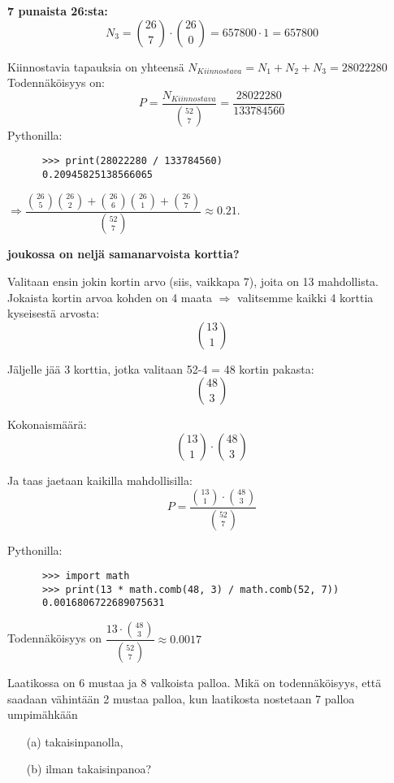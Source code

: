 \documentclass[12pt,a4paper]{article}
\begin{document}
\begin{kohta}
\begin{alakohta}
    \item \textbf{7 punaista 26:sta:} \\
    \[ N_3 = \binom{26}{7} \cdot \binom{26}{0} = 657800 \cdot 1 = 657800 \]
\end{alakohta}
Kiinnostavia tapauksia on yhteensä $N_{Kiinnostava} = N_1 + N_2 + N_3 = 28022280$\\

Todennäköisyys on:
\[
P = \frac{N_{Kiinnostava}}{\binom{52}{7}} = \frac{28022280}{133784560}
\]
  Pythonilla:
    \begin{verbatim}
      >>> print(28022280 / 133784560)
      0.20945825138566065
    \end{verbatim}

$\Rightarrow  \dfrac{\binom{26}{5}\binom{26}{2} + \binom{26}{6}\binom{26}{1} + \binom{26}{7}}{\binom{52}{7}} \approx 0.21$.






\pagebreak
  \item \textbf{joukossa on neljä samanarvoista korttia?}

  Valitaan ensin jokin kortin arvo (siis, vaikkapa 7), joita on 13 mahdollista.
  Jokaista kortin arvoa kohden on 4 maata $\Rightarrow $ valitsemme kaikki 4 korttia kyseisestä arvosta:
  \[
  \binom{13}{1}
  \]

  Jäljelle jää 3 korttia, jotka valitaan 52-4 = 48 kortin pakasta:
  \[
  \binom{48}{3}
  \]

  Kokonaismäärä:
  \[
  \binom{13}{1} \cdot \binom{48}{3}
  \]

  Ja taas jaetaan kaikilla mahdollisilla:
  \[
  P = \frac{\binom{13}{1} \cdot \binom{48}{3}}{\binom{52}{7}}
  \]

    Pythonilla:
    \begin{verbatim}
      >>> import math
      >>> print(13 * math.comb(48, 3) / math.comb(52, 7))
      0.0016806722689075631
    \end{verbatim}



  Todennäköisyys on \(\dfrac{13 \cdot \binom{48}{3}}{\binom{52}{7}} \approx 0.0017\)
\end{kohta}












\newpage
{}
Laatikossa on 6 mustaa ja 8 valkoista palloa. Mikä on
todennäköisyys, että saadaan vähintään 2 mustaa palloa, kun 
laatikosta nostetaan 7 palloa umpimähkään
\begin{enumerate}
\item[(a)] takaisinpanolla,
\item[(b)] ilman takaisinpanoa?
\end{enumerate}
\end{document}
